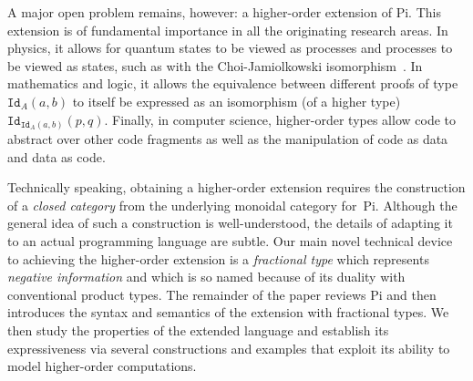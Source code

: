 \documentclass{llncs}
\newcommand{\roshan}[1]{}
\begin{document}
A major open problem remains, however: a higher-order extension of
{{Pi}}. This extension is of fundamental importance in all the originating
research areas.
In physics, it allows for quantum states to be viewed as processes and
processes to be viewed as states, such as with the Choi-Jamiolkowski
isomorphism~\cite{choi1975completely,jamiolkowski1972linear}.  In mathematics
and logic, it allows the equivalence between different proofs of type
$\texttt{Id}_A(a,b)$ to itself be expressed as an isomorphism (of a higher
type) $\texttt{Id}_{\texttt{Id}_A(a,b)}(p,q)$. Finally, in computer science,
higher-order types allow code to abstract over other code fragments as well
as the manipulation of code as data and data as code.

\roshan{Again, HOTT seems jarring. Saying something about logic in
  this way however seems useful. Maybe one can use one of the examples
  of equivalence between proofs that Baez's Rosetta stone uses. }

Technically speaking, obtaining a higher-order extension requires the
construction of a \emph{closed category} from the underlying monoidal
category for~{{Pi}}. Although the general idea of such a construction is
well-understood, the details of adapting it to an actual programming language
are subtle.  Our main novel technical device to achieving the higher-order
extension is a \emph{fractional type} which represents \emph{negative
  information} and which is so named because of its duality with conventional
product types.  
The remainder of the paper reviews {{Pi}} and then introduces the syntax and
semantics of the extension with fractional types. We then study the
properties of the extended language and establish its expressiveness via
several constructions and examples that exploit its ability to model
higher-order computations.

\end{document}
